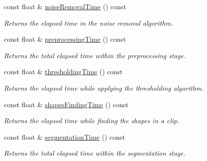 \begin{CompactItemize}
const float \& \hyperlink{class_statistics_2851ad08e1bd9604fe76c78cccc50e84}{noiseRemovalTime} () const 
\begin{CompactList}\small\item\em Returns the elapsed time in the noise removal algorithm. \item\end{CompactList}\item 
const float \& \hyperlink{class_statistics_96aafebb86be480130007bd437875156}{preprocessingTime} () const 
\begin{CompactList}\small\item\em Returns the total elapsed time within the preprocessing stage. \item\end{CompactList}\item 
const float \& \hyperlink{class_statistics_79a7c11e89528f21b663153c2636216a}{thresholdingTime} () const 
\begin{CompactList}\small\item\em Returns the elapsed time while applying the thresholding algorithm. \item\end{CompactList}\item 
const float \& \hyperlink{class_statistics_cdb8852bc99d12a619d130ae2e6948ee}{shapesFindingTime} () const 
\begin{CompactList}\small\item\em Returns the elapsed time while finding the shapes in a clip. \item\end{CompactList}\item 
const float \& \hyperlink{class_statistics_4cea19c3705fc315ce2b4300b3725ab8}{segmentationTime} () const 
\begin{CompactList}\small\item\em Returns the total elapsed time within the segmentation stage. \item\end{CompactList}\end{CompactItemize}
